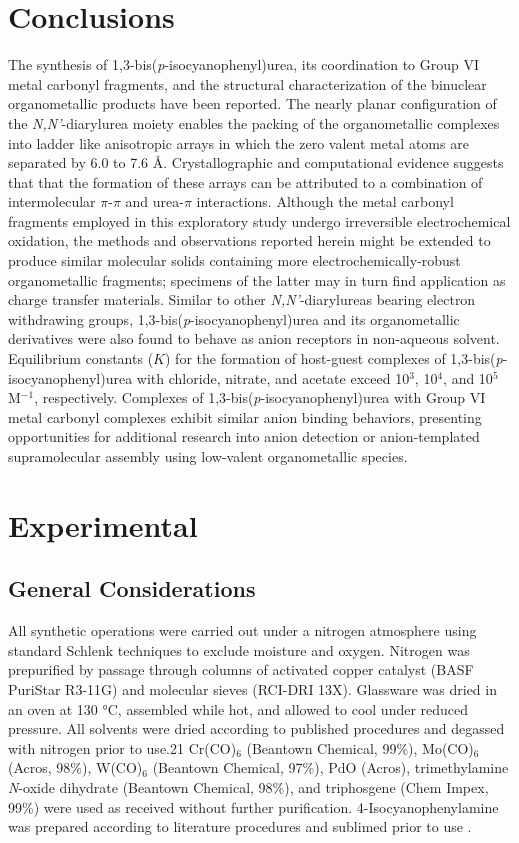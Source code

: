 \section{Conclusions}

The synthesis of 1,3-bis(\textit{p}-isocyanophenyl)urea, its coordination to Group VI metal carbonyl fragments, and the structural characterization of the binuclear organometallic products have been reported. The nearly planar configuration of the \textit{N,N'}-diarylurea moiety enables the packing of the organometallic complexes into ladder like anisotropic arrays in which the zero valent metal atoms are separated by 6.0 to 7.6 \AA. Crystallographic and computational evidence suggests that that the formation of these arrays can be attributed to a combination of intermolecular $\pi$-$\pi$ and urea-$\pi$ interactions. Although the metal carbonyl fragments employed in this exploratory study undergo irreversible electrochemical oxidation, the methods and observations reported herein might be extended to produce similar molecular solids containing more electrochemically-robust organometallic fragments; specimens of the latter may in turn find application as charge transfer materials. Similar to other \textit{N,N'}-diarylureas bearing electron withdrawing groups, 1,3-bis(\textit{p}-isocyanophenyl)urea and its organometallic derivatives were also found to behave as anion receptors in non-aqueous solvent. Equilibrium constants ($K$) for the formation of host-guest complexes of 1,3-bis(\textit{p}-isocyanophenyl)urea with chloride, nitrate, and acetate exceed 10$^{3}$, 10$^{4}$, and 10$^{5}$ M$^{-1}$, respectively. Complexes of 1,3-bis(\textit{p}-isocyanophenyl)urea with Group VI metal carbonyl complexes exhibit similar anion binding behaviors, presenting opportunities for additional research into anion detection or anion-templated supramolecular assembly using low-valent organometallic species.

\section{Experimental}
\subsection{General Considerations}
All synthetic operations were carried out under a nitrogen atmosphere using standard Schlenk techniques to exclude moisture and oxygen. Nitrogen was prepurified by passage through columns of activated copper catalyst (BASF PuriStar R3-11G) and molecular sieves (RCI-DRI 13X). Glassware was dried in an oven at 130 °C, assembled while hot, and allowed to cool under reduced pressure. All solvents were dried according to published procedures and degassed with nitrogen prior to use.21 Cr(CO)$_{6}$ (Beantown Chemical, 99\%), Mo(CO)$_{6}$ (Acros, 98\%), W(CO)$_{6}$ (Beantown Chemical, 97\%), PdO (Acros), trimethylamine \textit{N}-oxide dihydrate (Beantown Chemical, 98\%), and triphosgene (Chem Impex, 99\%) were used as received without further purification. 4-Isocyanophenylamine was prepared according to literature procedures and sublimed prior to use \citep{Heinze2003}. 

